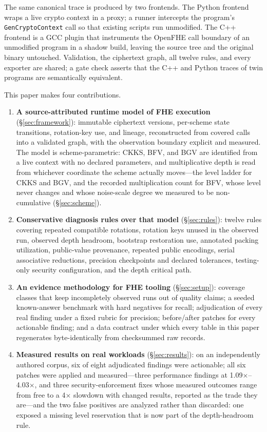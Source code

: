 \documentclass[sigconf,nonacm]{acmart}
\begin{document}
The same canonical trace is produced by two frontends. The Python frontend
wraps a live crypto context in a proxy; a runner intercepts the program's
\texttt{GenCryptoContext} call so that existing scripts run unmodified. The
C++ frontend is a GCC plugin that instruments the OpenFHE call boundary of an
unmodified program in a shadow build, leaving the source tree and the
original binary untouched. Validation, the ciphertext graph, all twelve
rules, and every exporter are shared; a gate check asserts that the C++ and
Python traces of twin programs are semantically equivalent.

This paper makes four contributions.

\begin{enumerate}
\item \textbf{A source-attributed runtime model of FHE execution}
  (\S\ref{sec:framework}): immutable ciphertext versions, per-scheme state
  transitions, rotation-key use, and lineage, reconstructed from covered
  calls into a validated graph, with the observation boundary explicit and
  measured. The model is scheme-parametric: CKKS, BFV, and BGV are identified
  from a live context with no declared parameters, and multiplicative depth
  is read from whichever coordinate the scheme actually moves---the level
  ladder for CKKS and BGV, and the recorded multiplication count for BFV,
  whose level never changes and whose noise-scale degree we measured to be
  non-cumulative (\S\ref{sec:scheme}).
\item \textbf{Conservative diagnosis rules over that model}
  (\S\ref{sec:rules}): twelve rules covering repeated compatible rotations,
  rotation keys unused in the observed run, observed depth headroom,
  bootstrap restoration use, annotated packing utilization, public-value
  provenance, repeated public encodings, serial associative reductions,
  precision checkpoints and declared tolerances, testing-only security
  configuration, and the depth critical path.
\item \textbf{An evidence methodology for FHE tooling} (\S\ref{sec:setup}):
  coverage classes that keep incompletely observed runs out of quality
  claims; a seeded known-answer benchmark with hard negatives for recall;
  adjudication of every real finding under a fixed rubric for precision;
  before/after patches for every actionable finding; and a data contract
  under which every table in this paper regenerates byte-identically from
  checksummed raw records.
\item \textbf{Measured results on real workloads} (\S\ref{sec:results}): on
  an independently authored corpus, six of eight adjudicated findings were
  actionable; all six patches were applied and measured---three performance
  findings at 1.09$\times$--4.03$\times$, and three security-enforcement
  fixes whose measured outcomes range from free to a 4$\times$ slowdown with
  changed results, reported as the trade they are---and the two false
  positives are analyzed rather than discarded: one exposed a missing level
  reservation that is now part of the depth-headroom rule.
\end{enumerate}
\end{document}
